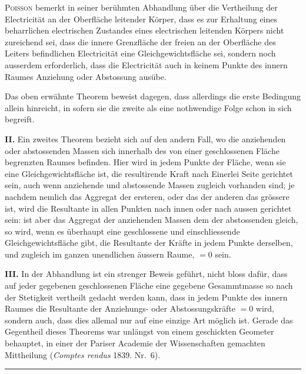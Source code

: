 \documentclass[12pt,a4paper]{article}
\begin{document}
\textsc{Poisson} bemerkt in seiner berühmten Abhandlung über die Vertheilung der Electricität an der Oberfläche leitender Körper, dass es zur Erhaltung eines beharrlichen electrischen Zustandes eines electrischen leitenden Körpers nicht zureichend sei, dass die innere Grenzfläche der freien an der Oberfläche des Leiters befindlichen Electricität eine Gleichgewichtsfläche sei, sondern noch ausserdem erforderlich, dass die Electricität auch in keinem Punkte des innern Raumes Anziehung oder Abstossung ausübe.

Das oben erwähnte Theorem beweist dagegen, dass allerdings die erste Bedingung allein hinreicht, in sofern sie die zweite als eine nothwendige Folge schon in sich begreift.

\bigskip

\textbf{II.} Ein zweites Theorem bezieht sich auf den andern Fall, wo die anziehenden oder abstossenden Massen sich innerhalb des von einer geschlossenen Fläche begrenzten Raumes befinden. Hier wird in jedem Punkte der Fläche, wenn sie eine Gleichgewichtsfläche ist, die resultirende Kraft nach Einerlei Seite gerichtet sein, auch wenn anziehende und abstossende Massen zugleich vorhanden sind; je nachdem nemlich das Aggregat der ersteren, oder das der anderen das grössere ist, wird die Resultante in allen Punkten nach innen oder nach aussen gerichtet sein: ist aber das Aggregat der anziehenden Massen dem der abstossenden gleich, so wird, wenn es überhaupt eine geschlossene und einschliessende Gleichgewichtsfläche gibt, die Resultante der Kräfte in jedem Punkte derselben, und zugleich im ganzen unendlichen äussern Raume, $= 0$ sein.

\bigskip

\textbf{III.} In der Abhandlung ist ein strenger Beweis geführt, nicht bloss dafür, dass auf jeder gegebenen geschlossenen Fläche eine gegebene Gesammtmasse so nach der Stetigkeit vertheilt gedacht werden kann, dass in jedem Punkte des innern Raumes die Resultante der Anziehungs- oder Abstossungskräfte $= 0$ wird, sondern auch, dass dies allemal nur auf eine einzige Art möglich ist. Gerade das Gegentheil dieses Theorems war unlängst von einem geschickten Geometer behauptet, in einer der Pariser Academie der Wissenschaften gemachten Mittheilung (\textit{Comptes rendus} 1839. Nr.~6).

\vspace{2em}
\begin{center}
    \rule{0.5\textwidth}{0.4pt}
\end{center}
\vspace{1em}
\end{document}
